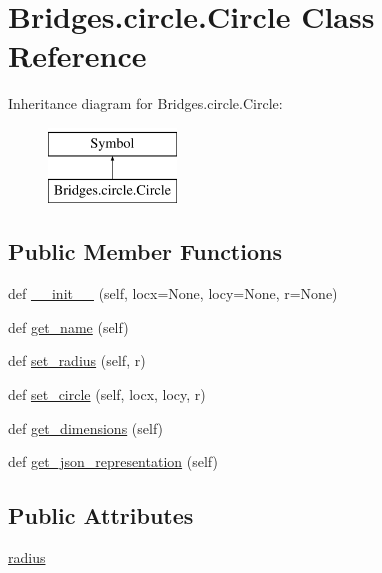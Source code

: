 \hypertarget{class_bridges_1_1circle_1_1_circle}{}\section{Bridges.\+circle.\+Circle Class Reference}
\label{class_bridges_1_1circle_1_1_circle}
Inheritance diagram for Bridges.\+circle.\+Circle\+:\begin{figure}[H]
\begin{center}
\leavevmode
\includegraphics[height=2.000000cm]{class_bridges_1_1circle_1_1_circle}
\end{center}
\end{figure}
\subsection*{Public Member Functions}
\begin{DoxyCompactItemize}
\item 
def \mbox{\hyperlink{class_bridges_1_1circle_1_1_circle_a0e2f0eba0cfdf7dc1119a0002eddcea5}{\+\_\+\+\_\+init\+\_\+\+\_\+}} (self, locx=None, locy=None, r=None)
\item 
def \mbox{\hyperlink{class_bridges_1_1circle_1_1_circle_a3a60ae8fe94fdedde07cbf8d02e024cc}{get\+\_\+name}} (self)
\item 
def \mbox{\hyperlink{class_bridges_1_1circle_1_1_circle_a14f3e3923d9a73a7bb68d0be793c9f32}{set\+\_\+radius}} (self, r)
\item 
def \mbox{\hyperlink{class_bridges_1_1circle_1_1_circle_a85792b4c4382baa5812f98a43457e1de}{set\+\_\+circle}} (self, locx, locy, r)
\item 
def \mbox{\hyperlink{class_bridges_1_1circle_1_1_circle_af7e5541a823ca0a3341eac9a8f78d97b}{get\+\_\+dimensions}} (self)
\item 
def \mbox{\hyperlink{class_bridges_1_1circle_1_1_circle_a85089832e547f5b8755ba2c37bc0e7b3}{get\+\_\+json\+\_\+representation}} (self)
\end{DoxyCompactItemize}
\subsection*{Public Attributes}
\begin{DoxyCompactItemize}
\item 
\mbox{\hyperlink{class_bridges_1_1circle_1_1_circle_acd92a71e93a265ad2679935b007f279f}{radius}}
\end{DoxyCompactItemize}


